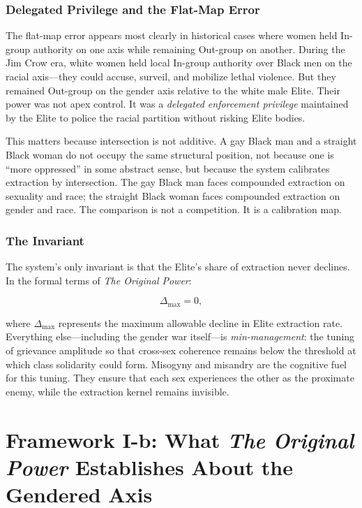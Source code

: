 \documentclass[12pt]{article}
\newcommand{\OP}{\textit{The Original Power}}
\begin{document}
\subsubsection{Delegated Privilege and the Flat-Map Error}

The flat-map error appears most clearly in historical cases where women held In-group authority on one axis while remaining Out-group on another. During the Jim Crow era, white women held local In-group authority over Black men on the racial axis---they could accuse, surveil, and mobilize lethal violence. But they remained Out-group on the gender axis relative to the white male Elite. Their power was not apex control. It was a \textit{delegated enforcement privilege} maintained by the Elite to police the racial partition without risking Elite bodies.

This matters because intersection is not additive. A gay Black man and a straight Black woman do not occupy the same structural position, not because one is ``more oppressed'' in some abstract sense, but because the system calibrates extraction by intersection. The gay Black man faces compounded extraction on sexuality and race; the straight Black woman faces compounded extraction on gender and race. The comparison is not a competition. It is a calibration map.

\subsubsection{The Invariant}

The system's only invariant is that the Elite's share of extraction never declines. In the formal terms of \OP:

\begin{equation}
  \Delta_{\max} = 0,
\end{equation}

where $\Delta_{\max}$ represents the maximum allowable decline in Elite extraction rate. Everything else---including the gender war itself---is \textit{min-management}: the tuning of grievance amplitude so that cross-sex coherence remains below the threshold at which class solidarity could form. Misogyny and misandry are the cognitive fuel for this tuning. They ensure that each sex experiences the other as the proximate enemy, while the extraction kernel remains invisible.

\section{Framework I-b: What \OP{} Establishes About the Gendered Axis}
\end{document}
